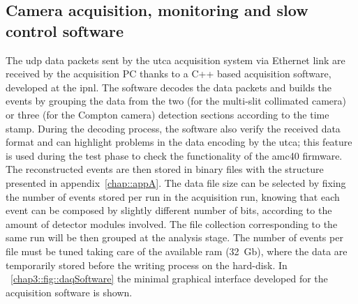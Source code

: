 
\subsection{Camera acquisition, monitoring and slow control software}\label{chap3::subsec::cameraSoftware}

The \gls{udp} data packets sent by the \gls{utca} acquisition system via Ethernet link are received by the acquisition PC thanks to a C++ based acquisition software, developed at the \gls{ipnl}. The software decodes the data packets and builds the events by grouping the data from the two (for the multi-slit collimated camera) or three (for the Compton camera) detection sections according to the time stamp. During the decoding process, the software also verify the received data format and can highlight problems in the data encoding by the \gls{utca}; this feature is used during the test phase to check the functionality of the \gls{amc}40 firmware. The reconstructed events are then stored in binary files with the structure presented in appendix~\ref{chap::appA}. The data file size can be selected by fixing the number of events stored per run in the acquisition run, knowing that each event can be composed by slightly different number of bits, according to the amount of detector modules involved. The file collection corresponding to the same run will be then grouped at the analysis stage. The number of events per file must be tuned taking care of the available \gls{ram} (32~Gb), where the data are temporarily stored before the writing process on the hard-disk. In \figurename~\ref{chap3::fig::daqSoftware} the minimal graphical interface developed for the acquisition software is shown.\\

